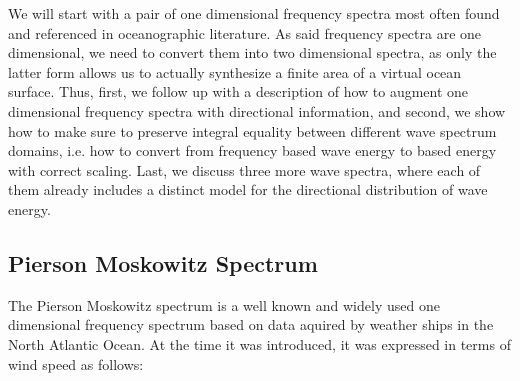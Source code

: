 We will start with a pair of one dimensional frequency spectra most often found
and referenced in oceanographic literature. As said frequency spectra are
one dimensional, we need to convert them into two dimensional \wavenumber
spectra, as only the latter form allows us to actually synthesize a finite area
of a virtual ocean surface. Thus, first, we follow up with a description of how
to augment one dimensional frequency spectra with directional information, and
second, we show how to make sure to preserve integral equality between
different wave spectrum domains, i.e. how to convert from frequency based wave
energy to \wavenumber based energy with correct scaling.
Last, we discuss three more wave spectra, where each of them already includes a
distinct model for the directional distribution of wave energy.
% 
% 
%
\subsection{Pierson Moskowitz Spectrum}
\label{sec:pierson_moskowitz}
%
The Pierson Moskowitz spectrum \citep{article:PiersonMoskowitz1964} is a well 
known and widely used one dimensional frequency spectrum based on data aquired 
by weather ships in the North Atlantic Ocean. At the time it was introduced, 
it was expressed in terms of wind speed as follows:

